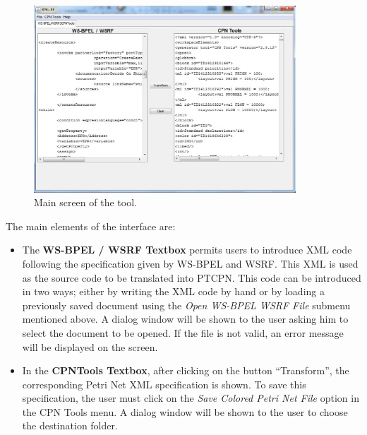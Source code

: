 \begin{center}
\begin{figure}[h]
\includegraphics[width=\columnwidth,height=7cm]{Figures/mainscreen.eps}
\vspace{-0.8cm} 
\caption{Main screen of the tool.}
\label{main}
\end{figure}
\end{center}
\vspace{-0.5cm} 
The main elements of the interface are:
\begin{itemize}
\item{The \textbf{WS-BPEL / WSRF Textbox} permits users to introduce
XML code following the specification given by WS-BPEL and WSRF. This XML is
used as the source code to be translated into PTCPN.
This code can be introduced in two ways; either by writing the XML code by hand or
by loading a previously saved document using the \emph{Open WS-BPEL WSRF File} submenu mentioned above. A dialog window will be shown to the user asking him to select the document to be opened. If the file is not valid, an error message will be displayed on the screen.}

\item{In the \textbf{CPNTools Textbox}, after clicking on the button ``Transform'',
the corresponding Petri Net XML specification is shown. To save this specification, the user must click on the \emph{Save Colored Petri Net File} option in the CPN Tools menu. A dialog window will be shown to the user to choose the destination folder.}
\end{itemize}

